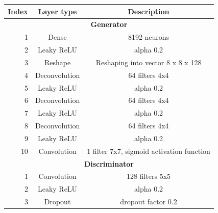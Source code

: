 \documentclass[]{article}
\begin{document}
\begin{table}[h!]
	\centering
	\begin{tabular}{|r|c|c|}
		\hline
		\multicolumn{1}{|c|}{\textbf{Index}} & \textbf{Layer type} & \textbf{Description}                      \\ \hline
		\multicolumn{3}{|c|}{\textbf{Generator}}                                                               \\ \hline
		1                                    & Dense               & 8192 neurons                              \\ \hline
		2                                    & Leaky ReLU          & alpha 0.2                                 \\ \hline
		3                                    & Reshape             & Reshaping into vector 8 x 8 x 128         \\ \hline
		4                                    & Deconvolution       & 64 filters 4x4                            \\ \hline
		5                                    & Leaky ReLU          & alpha 0.2                                 \\ \hline
		6                                    & Deconvolution       & 64 filters 4x4                            \\ \hline
		7                                    & Leaky ReLU          & alpha 0.2                                 \\ \hline
		8                                    & Deconvolution       & 64 filters 4x4                            \\ \hline
		9                                    & Leaky ReLU          & alpha 0.2                                 \\ \hline
		10                                   & Convolution         & 1 filter 7x7, sigmoid activation function \\ \hline
		\multicolumn{3}{|c|}{\textbf{Discriminator}}                                                                    \\ \hline
		1                                    & Convolution         & 128 filters 5x5                           \\ \hline
		2                                    & Leaky ReLU          & alpha 0.2                                 \\ \hline
		3                                    & Dropout             & dropout factor 0.2                        \\ \hline

\end{tabular}
\end{table}
\end{document}
